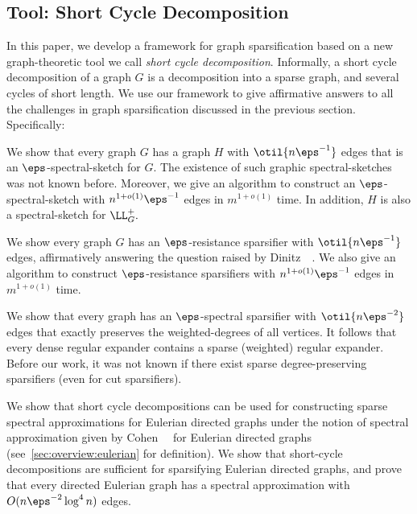 \subsection{Tool: Short Cycle Decomposition}
\label{subsec:contributions}
In this paper, we develop a framework for graph sparsification based
on a new graph-theoretic tool we call \emph{short cycle
  decomposition}. Informally, a short cycle decomposition of a graph
$G$ is a decomposition into a sparse graph, and several cycles of
short length.  We use our framework to give affirmative answers to all
the challenges in graph sparsification discussed in the previous
section. Specifically:
\begin{tight_enumerate}
\item We show that every graph $G$ has a graph $H$ with
  $\otil{n\eps^{-1}}$ edges that is an $\eps$-spectral-sketch for $G.$
  The existence of such
  graphic spectral-sketches was not known before.
  Moreover, we give an algorithm to construct an
  $\eps$-spectral-sketch with $n^{1+o(1)} \eps^{-1}$ edges in
  $m^{1+o(1)}$ time. In addition,  $H$ is also a spectral-sketch for $\LL_{G}^{+}.$

\item We show every graph $G$ has an $\eps$-resistance sparsifier with
  $\otil{n\eps^{-1}}$ edges, affirmatively answering the question
    raised by Dinitz~\etal~\cite{DinitzKW15}. We also give an
    algorithm to construct $\eps$-resistance sparsifiers with
    $n^{1+o(1)}\eps^{-1}$ edges in $m^{1+o(1)}$ time.

\item We show that every graph has an $\eps$-spectral sparsifier with
  $\otil{n\eps^{-2}}$ edges that exactly preserves the
  weighted-degrees of all vertices.  It follows that every dense
  regular expander contains a sparse (weighted) regular expander.
  Before our work, it was not known if there exist sparse
  degree-preserving sparsifiers (even for cut sparsifiers).
  


\item We show that short cycle decompositions can be used for
  constructing sparse spectral approximations for Eulerian directed
  graphs under the notion of spectral approximation given by
  Cohen~\etal~\cite{CohenKPPSV16} for Eulerian directed graphs
  (see~\ref{sec:overview:eulerian} for definition). We show that
  short-cycle decompositions are sufficient for sparsifying Eulerian
  directed graphs, and prove that every directed Eulerian graph has a
  spectral approximation with $O(n\eps^{-2}\log^{4} n)$ edges.
 

\end{tight_enumerate}
